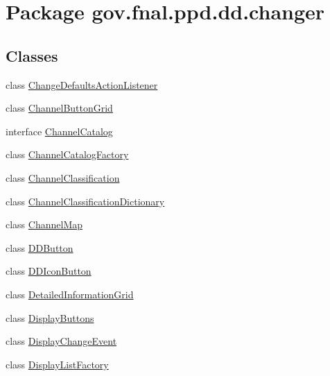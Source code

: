 \hypertarget{namespacegov_1_1fnal_1_1ppd_1_1dd_1_1changer}{\section{Package gov.\-fnal.\-ppd.\-dd.\-changer}
\label{namespacegov_1_1fnal_1_1ppd_1_1dd_1_1changer}
}
\subsection*{Classes}
\begin{DoxyCompactItemize}
\item 
class \hyperlink{classgov_1_1fnal_1_1ppd_1_1dd_1_1changer_1_1ChangeDefaultsActionListener}{Change\-Defaults\-Action\-Listener}
\item 
class \hyperlink{classgov_1_1fnal_1_1ppd_1_1dd_1_1changer_1_1ChannelButtonGrid}{Channel\-Button\-Grid}
\item 
interface \hyperlink{interfacegov_1_1fnal_1_1ppd_1_1dd_1_1changer_1_1ChannelCatalog}{Channel\-Catalog}
\item 
class \hyperlink{classgov_1_1fnal_1_1ppd_1_1dd_1_1changer_1_1ChannelCatalogFactory}{Channel\-Catalog\-Factory}
\item 
class \hyperlink{classgov_1_1fnal_1_1ppd_1_1dd_1_1changer_1_1ChannelClassification}{Channel\-Classification}
\item 
class \hyperlink{classgov_1_1fnal_1_1ppd_1_1dd_1_1changer_1_1ChannelClassificationDictionary}{Channel\-Classification\-Dictionary}
\item 
class \hyperlink{classgov_1_1fnal_1_1ppd_1_1dd_1_1changer_1_1ChannelMap}{Channel\-Map}
\item 
class \hyperlink{classgov_1_1fnal_1_1ppd_1_1dd_1_1changer_1_1DDButton}{D\-D\-Button}
\item 
class \hyperlink{classgov_1_1fnal_1_1ppd_1_1dd_1_1changer_1_1DDIconButton}{D\-D\-Icon\-Button}
\item 
class \hyperlink{classgov_1_1fnal_1_1ppd_1_1dd_1_1changer_1_1DetailedInformationGrid}{Detailed\-Information\-Grid}
\item 
class \hyperlink{classgov_1_1fnal_1_1ppd_1_1dd_1_1changer_1_1DisplayButtons}{Display\-Buttons}
\item 
class \hyperlink{classgov_1_1fnal_1_1ppd_1_1dd_1_1changer_1_1DisplayChangeEvent}{Display\-Change\-Event}
\item 
class \hyperlink{classgov_1_1fnal_1_1ppd_1_1dd_1_1changer_1_1DisplayListFactory}{Display\-List\-Factory}

\end{DoxyCompactItemize}
